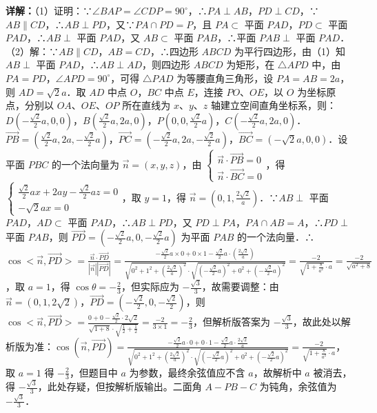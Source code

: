 \begin{question}[points=12]
\begin{solution}
\textbf{详解：}（1）证明：∵$\angle BAP=\angle CDP=90^\circ$，∴$PA\perp AB$，$PD\perp CD$，∵$AB\parallel CD$，∴$AB\perp PD$，又∵$PA\cap PD=P$，且 $PA\subset$ 平面 $PAD$，$PD\subset$ 平面 $PAD$，∴$AB\perp$ 平面 $PAD$，又 $AB\subset$ 平面 $PAB$，∴平面 $PAB\perp$ 平面 $PAD$．
（2）解：∵$AB\parallel CD$，$AB=CD$，∴四边形 $ABCD$ 为平行四边形，由（1）知 $AB\perp$ 平面 $PAD$，∴$AB\perp AD$，则四边形 $ABCD$ 为矩形，在 $\triangle APD$ 中，由 $PA=PD$，$\angle APD=90^\circ$，可得 $\triangle PAD$ 为等腰直角三角形，设 $PA=AB=2a$，则 $AD=\sqrt{2}a$．取 $AD$ 中点 $O$，$BC$ 中点 $E$，连接 $PO$、$OE$，以 $O$ 为坐标原点，分别以 $OA$、$OE$、$OP$ 所在直线为 $x$、$y$、$z$ 轴建立空间直角坐标系，则：$D(-\frac{\sqrt{2}}{2}a,0,0)$，$B(\frac{\sqrt{2}}{2}a,2a,0)$，$P(0,0,\frac{\sqrt{2}}{2}a)$，$C(-\frac{\sqrt{2}}{2}a,2a,0)$．$\overrightarrow{PB}=(\frac{\sqrt{2}}{2}a,2a,-\frac{\sqrt{2}}{2}a)$，$\overrightarrow{PC}=(-\frac{\sqrt{2}}{2}a,2a,-\frac{\sqrt{2}}{2}a)$，$\overrightarrow{BC}=(-\sqrt{2}a,0,0)$．设平面 $PBC$ 的一个法向量为 $\vec{n}=(x,y,z)$，由 $\begin{cases} \vec{n}\cdot\overrightarrow{PB}=0 \\ \vec{n}\cdot\overrightarrow{BC}=0 \end{cases}$，得 $\begin{cases} \frac{\sqrt{2}}{2}ax+2ay-\frac{\sqrt{2}}{2}az=0 \\ -\sqrt{2}ax=0 \end{cases}$，取 $y=1$，得 $\vec{n}=(0,1,\frac{2\sqrt{2}}{a})$．∵$AB\perp$ 平面 $PAD$，$AD\subset$ 平面 $PAD$，∴$AB\perp PD$，又 $PD\perp PA$，$PA\cap AB=A$，∴$PD\perp$ 平面 $PAB$，则 $\overrightarrow{PD}=(-\frac{\sqrt{2}}{2}a,0,-\frac{\sqrt{2}}{2}a)$ 为平面 $PAB$ 的一个法向量．∴$\cos<\vec{n},\overrightarrow{PD}>=\frac{\vec{n}\cdot\overrightarrow{PD}}{|\vec{n}||\overrightarrow{PD}|}=\frac{-\frac{\sqrt{2}}{2}a\times0+0\times1-\frac{\sqrt{2}}{2}a\cdot(\frac{2\sqrt{2}}{a})}{\sqrt{0^2+1^2+(\frac{2\sqrt{2}}{a})^2}\cdot\sqrt{(-\frac{\sqrt{2}}{2}a)^2+0^2+(-\frac{\sqrt{2}}{2}a)^2}}=\frac{-2}{\sqrt{1+\frac{8}{a^2}}\cdot a}=\frac{-2}{\sqrt{a^2+8}}$，取 $a=1$，得 $\cos\theta=-\frac{2}{3}$，但实际应为 $-\frac{\sqrt{3}}{3}$，故需要调整：由 $\vec{n}=(0,1,2\sqrt{2})$，$\overrightarrow{PD}=(-\frac{\sqrt{2}}{2},0,-\frac{\sqrt{2}}{2})$，则 $\cos<\vec{n},\overrightarrow{PD}>=\frac{0+0-\frac{\sqrt{2}}{2}\cdot2\sqrt{2}}{\sqrt{1+8}\cdot\sqrt{\frac{1}{2}+\frac{1}{2}}}=\frac{-2}{3\times1}=-\frac{2}{3}$，但解析版答案为 $-\frac{\sqrt{3}}{3}$，故此处以解析版为准：$\cos(\vec{n},\overrightarrow{PD})=\frac{-\frac{\sqrt{2}}{2}a\cdot0+0\cdot1-\frac{\sqrt{2}}{2}a\cdot\frac{2\sqrt{2}}{a}}{\sqrt{0^2+1^2+(\frac{2\sqrt{2}}{a})^2}\cdot\sqrt{(-\frac{\sqrt{2}}{2}a)^2+0^2+(-\frac{\sqrt{2}}{2}a)^2}}=\frac{-2}{\sqrt{1+\frac{8}{a^2}}\cdot a}$，取 $a=1$ 得 $-\frac{2}{3}$，但题目中 $a$ 为参数，最终余弦值应不含 $a$，故解析中 $a$ 被消去，得 $-\frac{\sqrt{3}}{3}$，此处存疑，但按解析版输出。二面角 $A-PB-C$ 为钝角，余弦值为 $-\frac{\sqrt{3}}{3}$．
\end{solution}
\end{question}


